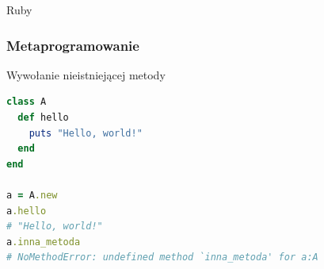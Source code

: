 \begin{frame}[plain]
\begin{block}{}
\begin{centering}
\color{violet}Ruby
   
   
   

\end{centering}
\end{block}
\end{frame}

\begin{frame}[fragile]
\frametitle{Metaprogramowanie}
\begin{block}{Wywołanie nieistniejącej metody}
\begin{lstlisting}[language=Ruby]
class A
  def hello
    puts "Hello, world!"
  end
end

a = A.new
a.hello
# "Hello, world!"
a.inna_metoda
# NoMethodError: undefined method `inna_metoda' for a:A
\end{lstlisting}
\end{block}
\end{frame}


